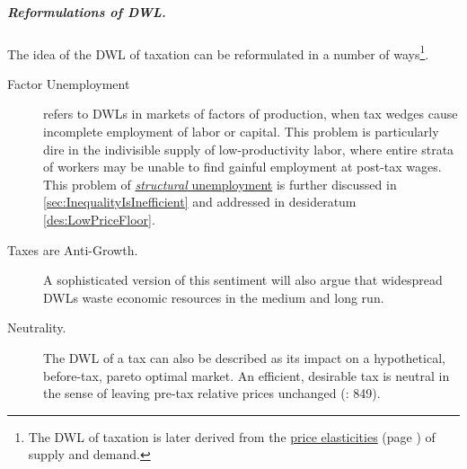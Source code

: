 \subparagraph{Reformulations of DWL.} The idea of the DWL of taxation can be reformulated in a number of ways\footnote{The DWL of taxation is later derived from the \hyperref[sec:TaxInelastic]{price elasticities} (page \pageref{sec:TaxInelastic}) of supply and demand.}.
\begin{description}
	\item[Factor Unemployment] refers to DWLs in markets of factors of production, when tax wedges cause incomplete employment of labor or capital. This problem is particularly dire in the indivisible supply of low-productivity labor, where entire strata of workers may be unable to find gainful employment at post-tax wages. This problem of \hyperref[sec:StructuralUnemployment]{\emph{structural} unemployment} is further discussed in \autoref{sec:InequalityIsInefficient} and addressed in desideratum \ref{des:LowPriceFloor}.
	\item[Taxes are Anti-Growth.] A sophisticated version of this sentiment will also argue that widespread DWLs waste economic resources in the medium and long run.
	\item[Neutrality.] The DWL of a tax can also be described as its impact on a hypothetical, before-tax, pareto optimal market. An efficient, desirable tax is neutral in the sense of leaving pre-tax relative prices unchanged (\citealt{McCaffery2005}: 849).
\end{description}




